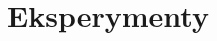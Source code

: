 \documentclass[../FM_mgr.tex]{subfiles}
\begin{document}
\chapter{Eksperymenty} \label{chapter:experiments}
\end{document}
